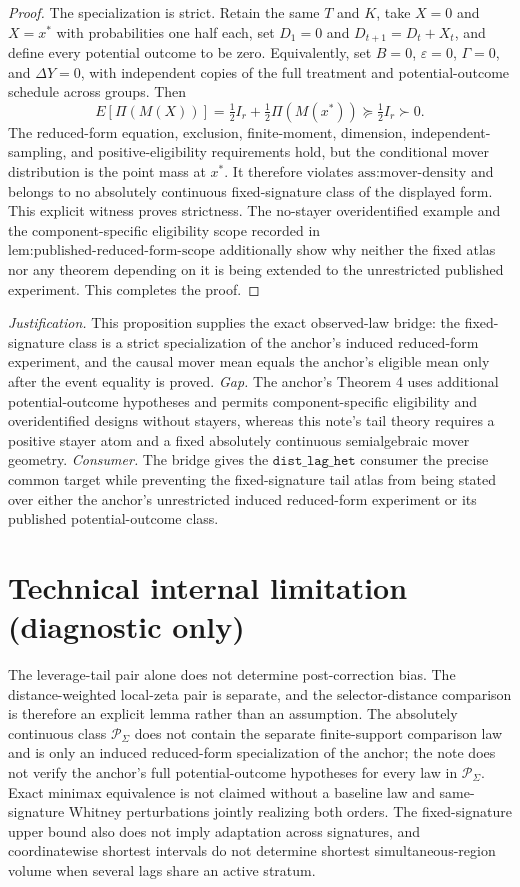 \documentclass{article}
\begin{document}
\begin{proof}
The specialization is strict. Retain the same \(T\) and \(K\), take \(X=0\) and \(X=x^*\) with probabilities one half each, set \(D_1=0\) and \(D_{t+1}=D_t+X_t\), and define every potential outcome to be zero. Equivalently, set \(B=0\), \(\varepsilon=0\), \(\Gamma=0\), and \(\Delta Y=0\), with independent copies of the full treatment and potential-outcome schedule across groups. Then
\[
E[\Pi(M(X))]
=\tfrac12I_r+\tfrac12\Pi(M(x^*))
\succeq\tfrac12I_r\succ0.
\]
The reduced-form equation, exclusion, finite-moment, dimension, independent-sampling, and positive-eligibility requirements hold, but the conditional mover distribution is the point mass at \(x^*\). It therefore violates \(\text{ass:mover-density}\) and belongs to no absolutely continuous fixed-signature class of the displayed form. This explicit witness proves strictness. The no-stayer overidentified example and the component-specific eligibility scope recorded in \(\text{lem:published-reduced-form-scope}\) additionally show why neither the fixed atlas nor any theorem depending on it is being extended to the unrestricted published experiment. This completes the proof.
\end{proof}
\par\smallskip\noindent \textit{Justification.} This proposition supplies the exact observed-law bridge: the fixed-signature class is a strict specialization of the anchor's induced reduced-form experiment, and the causal mover mean equals the anchor's eligible mean only after the event equality is proved. \textit{Gap.} The anchor's Theorem 4 uses additional potential-outcome hypotheses and permits component-specific eligibility and overidentified designs without stayers, whereas this note's tail theory requires a positive stayer atom and a fixed absolutely continuous semialgebraic mover geometry. \textit{Consumer.} The bridge gives the \(\texttt{dist\_lag\_het}\) consumer the precise common target while preventing the fixed-signature tail atlas from being stated over either the anchor's unrestricted induced reduced-form experiment or its published potential-outcome class.

\section*{Technical internal limitation (diagnostic only)}

The leverage-tail pair alone does not determine post-correction bias. The distance-weighted local-zeta pair is separate, and the selector-distance comparison is therefore an explicit lemma rather than an assumption. The absolutely continuous class \(\mathcal P_\Sigma\) does not contain the separate finite-support comparison law and is only an induced reduced-form specialization of the anchor; the note does not verify the anchor's full potential-outcome hypotheses for every law in \(\mathcal P_\Sigma\). Exact minimax equivalence is not claimed without a baseline law and same-signature Whitney perturbations jointly realizing both orders. The fixed-signature upper bound also does not imply adaptation across signatures, and coordinatewise shortest intervals do not determine shortest simultaneous-region volume when several lags share an active stratum.
\end{document}
